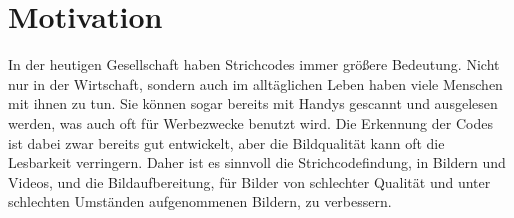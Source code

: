 \section{Motivation}
In der heutigen Gesellschaft haben Strichcodes immer größere Bedeutung. Nicht nur in der Wirtschaft, sondern auch im alltäglichen Leben haben viele Menschen mit ihnen zu tun. Sie können sogar bereits mit Handys gescannt und ausgelesen werden, was auch oft für Werbezwecke benutzt wird. Die Erkennung der Codes ist dabei zwar bereits gut entwickelt, aber die Bildqualität kann oft die Lesbarkeit verringern. Daher ist es sinnvoll die Strichcodefindung, in Bildern und Videos, und die Bildaufbereitung, für Bilder von schlechter Qualität und unter schlechten Umständen aufgenommenen Bildern, zu verbessern.